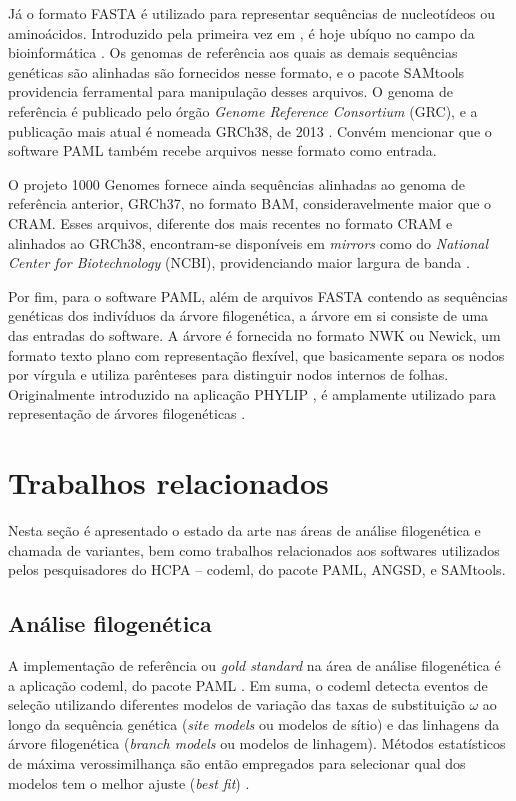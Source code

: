 \documentclass[cic,tc]{iiufrgs}
\begin{document}
Já o formato FASTA é utilizado para representar sequências
de nucleotídeos ou aminoácidos. Introduzido pela primeira vez em
\cite{fasta}, é hoje ubíquo no campo da
bioinformática \cite{shen2016seqkit}. Os genomas de referência aos quais as
demais sequências genéticas são alinhadas são fornecidos nesse formato, e o
pacote SAMtools providencia ferramental para manipulação desses arquivos. O
genoma de referência é publicado pelo órgão \textit{Genome Reference
Consortium} (GRC), e a publicação mais atual é nomeada GRCh38, de
2013 \cite{GUO201783}. Convém mencionar que o software PAML também recebe
arquivos nesse formato como entrada.

O projeto 1000 Genomes fornece ainda sequências alinhadas ao genoma de
referência anterior, GRCh37, no formato BAM, consideravelmente maior que o
CRAM. Esses arquivos, diferente dos mais recentes no formato CRAM e alinhados
ao GRCh38, encontram-se disponíveis em \textit{mirrors} como do
\textit{National Center for Biotechnology} (NCBI), providenciando maior largura
de banda \cite{clarke20121000}.

Por fim, para o software PAML, além de arquivos FASTA contendo as sequências
genéticas dos indivíduos da árvore filogenética, a árvore em si consiste de uma
das entradas do software. A árvore é fornecida no formato NWK ou Newick, um
formato texto plano com representação flexível, que basicamente separa os nodos
por vírgula e utiliza parênteses para distinguir nodos internos de folhas.
Originalmente introduzido na aplicação PHYLIP \cite{felsenstein1993phylip}, é
amplamente utilizado para representação de árvores filogenéticas \cite{fredslund2006phy}.

%
%
%
%

\chapter{Trabalhos relacionados}
\label{chap:anteriores}

Nesta seção é apresentado o estado da arte nas áreas de análise filogenética e
chamada de variantes, bem como trabalhos relacionados aos softwares utilizados
pelos pesquisadores do HCPA -- codeml, do pacote PAML, ANGSD, e SAMtools.

\section{Análise filogenética}

A implementação de referência ou \textit{gold standard} na área de análise
filogenética é a aplicação codeml, do pacote PAML \cite{valle2014optimization}.
Em suma, o codeml detecta eventos de seleção utilizando diferentes modelos de
variação das taxas de substituição $\omega$ ao longo da sequência genética
(\textit{site models} ou modelos de sítio) e das linhagens da árvore
filogenética (\textit{branch models} ou modelos de linhagem). Métodos
estatísticos de máxima verossimilhança são então empregados para selecionar
qual dos modelos tem o melhor ajuste (\textit{best fit}) \cite{yang2007paml}.
\end{document}
